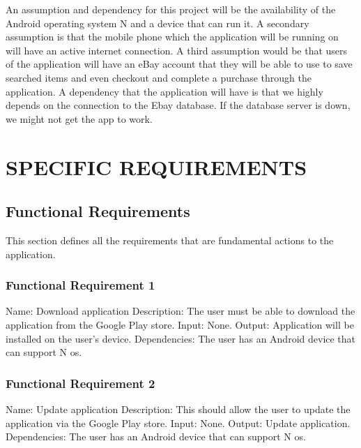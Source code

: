 \documentclass[journal,compsoc, 10pt, draftclsnofoot, onecolumn]{IEEEtran}
\begin{document}
An assumption and dependency for this project will be the availability of the 
Android operating system N and a device that can run it. A secondary assumption 
is that the mobile phone which the application will be running on will have an 
active internet connection. A third assumption would be that users of the 
application will have an eBay account that they will be able to use to save 
searched items and even checkout and complete a purchase through the 
application. A dependency that the application will have is that we highly 
depends on the connection to the Ebay database. If the database server is down, 
we might not get the app to work.

\section{SPECIFIC REQUIREMENTS}

\subsection{Functional Requirements}

This section defines all the requirements that are fundamental actions to the 
application.

\subsubsection{Functional Requirement 1}
Name: Download application \newline
Description: The user must be able to download the application from the Google 
Play store. \newline
Input: None. \newline
Output: Application will be installed on the user's device. \newline
Dependencies: The user has an Android device that can support N os.

\subsubsection{Functional Requirement 2}
Name: Update application\newline
Description: This should allow the user to update the application via the Google
 Play store.\newline
Input: None.\newline
Output: Update application.\newline
Dependencies: The user has an Android device that can support N os.
\end{document}
